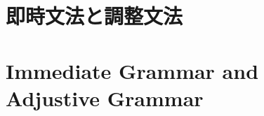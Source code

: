 \documentclass[a4paper]{article}
\begin{document}

\ifJPN
  \section{即時文法と調整文法}
\else
  \section{Immediate Grammar and Adjustive Grammar}
\fi
\end{document}
